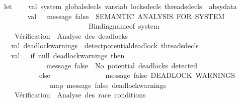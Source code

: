 \begin{isabellebody}
\ \ let\isanewline
\ \ \ \ val\ {\isacharbraceleft}{\kern0pt}system{\isacharcomma}{\kern0pt}\ globals{\isacharunderscore}{\kern0pt}decls{\isacharcomma}{\kern0pt}\ varstab{\isacharcomma}{\kern0pt}\ locks{\isacharunderscore}{\kern0pt}decls{\isacharcomma}{\kern0pt}\ threads{\isacharunderscore}{\kern0pt}decls{\isacharbraceright}{\kern0pt}\ {\isacharequal}{\kern0pt}\ absy{\isacharunderscore}{\kern0pt}data\isanewline
\ \ \ \ \isanewline
\ \ \ \ val\ {\isacharunderscore}{\kern0pt}\ {\isacharequal}{\kern0pt}\ message\ false\ {\isacharparenleft}{\kern0pt}{\isachardoublequote}{\kern0pt}{\isacharequal}{\kern0pt}{\isacharequal}{\kern0pt}{\isacharequal}{\kern0pt}\ SEMANTIC\ ANALYSIS\ FOR\ SYSTEM{\isacharcolon}{\kern0pt}\ {\isachardoublequote}{\kern0pt}\ {\isacharcircum}{\kern0pt}\ \isanewline
\ \ \ \ \ \ \ \ \ \ \ \ \ \ \ \ \ \ \ \ \ \ \ \ \ \ Binding{\isachardot}{\kern0pt}name{\isacharunderscore}{\kern0pt}of\ system\ {\isacharcircum}{\kern0pt}\ {\isachardoublequote}{\kern0pt}\ {\isacharequal}{\kern0pt}{\isacharequal}{\kern0pt}{\isacharequal}{\kern0pt}{\isachardoublequote}{\kern0pt}{\isacharparenright}{\kern0pt}\isanewline
\ \ \ \ \isanewline
\ \ \ \ {\isacharparenleft}{\kern0pt}{\isacharasterisk}{\kern0pt}\ Vérification\ {}{\isacharcolon}{\kern0pt}\ Analyse\ des\ deadlocks\ {\isacharasterisk}{\kern0pt}{\isacharparenright}{\kern0pt}\isanewline
\ \ \ \ val\ deadlock{\isacharunderscore}{\kern0pt}warnings\ {\isacharequal}{\kern0pt}\ detect{\isacharunderscore}{\kern0pt}potential{\isacharunderscore}{\kern0pt}deadlock\ threads{\isacharunderscore}{\kern0pt}decls\isanewline
\ \ \ \ val\ {\isacharunderscore}{\kern0pt}\ {\isacharequal}{\kern0pt}\ if\ null\ deadlock{\isacharunderscore}{\kern0pt}warnings\ then\ \isanewline
\ \ \ \ \ \ \ \ \ \ \ \ \ \ message\ false\ {\isachardoublequote}{\kern0pt}{\isasymcheckmark}\ No\ potential\ deadlocks\ detected{\isachardoublequote}{\kern0pt}\isanewline
\ \ \ \ \ \ \ \ \ \ \ \ else\ \isanewline
\ \ \ \ \ \ \ \ \ \ \ \ \ \ {\isacharparenleft}{\kern0pt}message\ false\ {\isachardoublequote}{\kern0pt}DEADLOCK\ WARNINGS{\isacharcolon}{\kern0pt}{\isachardoublequote}{\kern0pt}{\isacharsemicolon}{\kern0pt}\isanewline
\ \ \ \ \ \ \ \ \ \ \ \ \ \ \ map\ {\isacharparenleft}{\kern0pt}message\ false{\isacharparenright}{\kern0pt}\ deadlock{\isacharunderscore}{\kern0pt}warnings{\isacharsemicolon}{\kern0pt}\ {\isacharparenleft}{\kern0pt}{\isacharparenright}{\kern0pt}{\isacharparenright}{\kern0pt}\isanewline
\ \ \ \ \isanewline
\ \ \ \ {\isacharparenleft}{\kern0pt}{\isacharasterisk}{\kern0pt}\ Vérification\ {}{\isacharcolon}{\kern0pt}\ Analyse\ des\ race\ conditions\ {\isacharasterisk}{\kern0pt}{\isacharparenright}{\kern0pt}\isanewline

\end{isabellebody}
